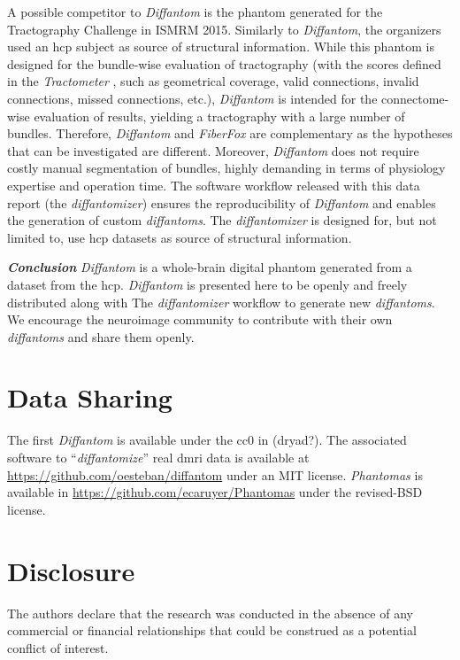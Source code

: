 \documentclass[english]{frontiers/frontiersSCNS} %
\begin{document}
A possible competitor to \emph{Diffantom} is the phantom generated for the Tractography Challenge in
  ISMRM 2015.
Similarly to \emph{Diffantom}, the organizers used an \gls*{hcp} subject as source of structural information.
While this phantom is designed for the bundle-wise evaluation of tractography (with the scores defined in the
  \emph{Tractometer} \citep{cote_tractometer_2013}, such as geometrical coverage, valid connections, invalid connections,
  missed connections, etc.), \emph{Diffantom} is intended for the connectome-wise evaluation of results,
  yielding a tractography with a large number of bundles.
Therefore, \emph{Diffantom} and \emph{FiberFox} are complementary as the hypotheses that can be investigated are different.
Moreover, \emph{Diffantom} does not require costly manual segmentation of bundles, highly demanding in terms of physiology
  expertise and operation time.
The software workflow released with this data report (the \emph{diffantomizer}) ensures the reproducibility of
  \emph{Diffantom} and enables the generation of custom \emph{diffantoms}.
The \emph{diffantomizer} is designed for, but not limited to, use \gls*{hcp} datasets as source of structural information.

\noindent\textbf{\textit{Conclusion\textcolon}}\label{sec:conclusion} %
\emph{Diffantom} is a whole-brain digital phantom generated from a dataset from the \acrlong*{hcp}.
\emph{Diffantom} is presented here to be openly and freely distributed along with The \emph{diffantomizer} workflow
  to generate new \emph{diffantoms}.
We encourage the neuroimage community to contribute with their own \emph{diffantoms} and share them openly.


\section*{Data Sharing}
The first \emph{Diffantom} is available under the \gls*{cc0} in {\color{red} (dryad?)}.
The associated software to ``\emph{diffantomize}'' real \gls*{dmri} data is available at \url{https://github.com/oesteban/diffantom}
  under an MIT license.
\emph{Phantomas} is available in \url{https://github.com/ecaruyer/Phantomas} under the revised-BSD license.

\section*{Disclosure}

The authors declare that the research was conducted in the absence of any commercial or financial relationships that could be construed as a potential conflict of interest.
\end{document}
